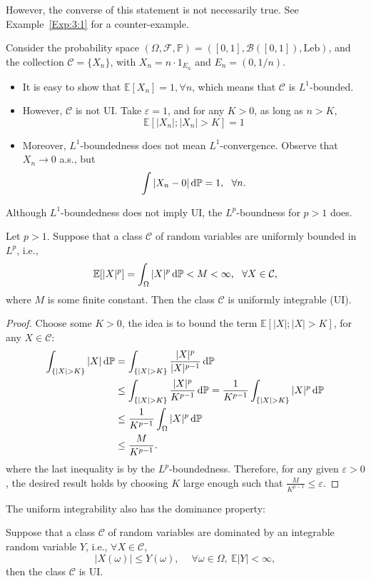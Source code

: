 However, the converse of this statement is not necessarily true. See Example~\ref{Exp:3:1} for a counter-example.
\begin{example}\label{Exp:3:1}
Consider the probability space 
 $(\Omega,\mathcal{F},\mathbb{P})=([0,1],\mathcal{B}([0,1]),\text{Leb})$,
 and the collection $\mathcal{C}=\{X_n\}$, with $X_n=n\cdot 1_{E_n}$ and $E_n=(0,1/n)$.
\begin{itemize}
\item
It is easy to show that $\mathbb{E}[X_n]=1,\forall n$, which means that $\mathcal{C}$ is $L^1$-bounded.
\item
However, $\mathcal{C}$ is not UI. Take $\varepsilon=1$, and for any $K>0$, as long as $n>K$, 
\[
\mathbb{E}[|X_n|;|X_n|>K]=1
\]
\item
Moreover, $L^1$-boundedness does not mean $L^1$-convergence.
Observe that $X_n\to0$ a.s., but 
\[
\int|X_n - 0|\,\mathrm{d}\mathbb{P}=1,~~\forall n.
\]
\end{itemize}
\end{example}

Although $L^1$-boundedness does not imply UI, the $L^p$-boundness for $p>1$ does.
\begin{theorem}\label{The:2:6}
Let $p>1$. Suppose that a class $\mathcal{C}$ of random variables are uniformly bounded in $L^p$, i.e.,
\[
\mathbb{E}[|X|^p]=\int_{\Omega}|X|^p\,\mathrm{d}\mathbb{P}<M<\infty,~~\forall X\in\mathcal{C},
\]
where $M$ is some finite constant.
Then the class $\mathcal{C}$ is uniformly integrable (UI).
\end{theorem}

\begin{proof}
Choose some $K>0$, 
the idea is to bound the term $\mathbb{E}[|X|;|X|>K]$, for any $X\in\mathcal{C}$:
\begin{align*}
\int_{\{|X|>K\}}|X|\diff\mathbb{P}
&
=\int_{\{|X|>K\}}\frac{|X|^p}{|X|^{p-1}}\diff\mathbb{P}
\\&\le
\int_{\{|X|>K\}}\frac{|X|^p}{K^{p-1}}\diff\mathbb{P}
=
\frac{1}{K^{p-1}}\int_{\{|X|>K\}}|X|^p\diff\mathbb{P}\\
&\le\frac{1}{K^{p-1}}\int_{\Omega}|X|^p\diff\mathbb{P}\\
&\le\frac{M}{K^{p-1}}.
\end{align*}
where the last inequality is by the $L^p$-boundedness.
Therefore, for any given $\varepsilon>0$, the desired result holds by choosing $K$ large enough such that $\frac{M}{K^{p-1}}\le\varepsilon$.

\end{proof}
The uniform integrability also has the dominance property:
\begin{theorem}\label{The:2:7}
Suppose that a class $\mathcal{C}$ of random variables are dominated by an integrable random variable $Y$, i.e., $\forall X\in\mathcal{C}$,
\[
|X(\omega)|\le Y(\omega),\ \quad
\forall\omega\in\Omega,~
\mathbb{E}|Y|<\infty,
\]
then the class $\mathcal{C}$ is UI.
\end{theorem}

